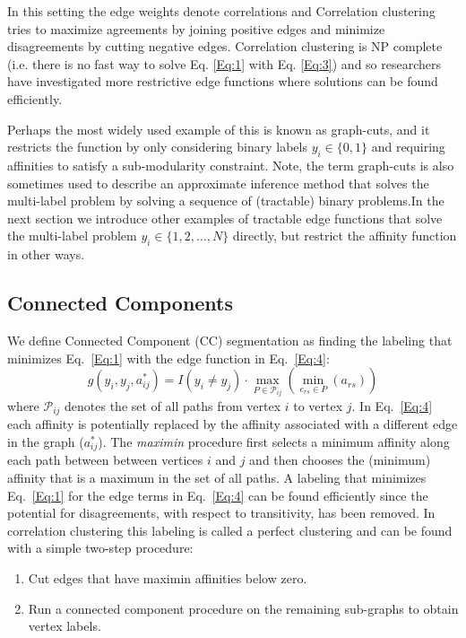 \documentclass[letterpaper,twocolumn,fleqn]{article}
\begin{document}
In this setting  the edge weights denote correlations and Correlation clustering tries to maximize agreements by joining positive edges and minimize disagreements by cutting negative edges. Correlation clustering is NP complete (i.e. there is no fast way to solve Eq. \ref{Eq:1} with Eq. \ref{Eq:3}) and so researchers have investigated more restrictive edge functions where solutions can be found efficiently. 

Perhaps the most widely used example of this is known as graph-cuts, and it restricts the function by only considering binary labels $y_i \in \{0,1\}$ and requiring affinities to satisfy a sub-modularity constraint. Note, the term graph-cuts is also sometimes used to describe an approximate inference method that solves the multi-label problem by solving a sequence of (tractable) binary problems.In the next section we introduce other examples of tractable edge functions that solve the multi-label problem $y_i \in \{1,2,...,N\}$ directly, but restrict the affinity function in other ways. 

\subsection{Connected Components}
\label{subsec:cc}

We define Connected Component (CC) segmentation as finding the labeling that minimizes Eq.~\ref{Eq:1} with the edge function in Eq.~\ref{Eq:4}: 
\begin{equation}
    g(y_i, y_j, a_{ij}^*) = I(y_i \neq y_j)\cdot\max_{P\in\mathcal{P}_{ij}}\left( \min_{e_{rs} \in P} ( a_{rs} ) \right) 
    \label{Eq:4}
\end{equation}
where $\mathcal{P}_{ij}$ denotes the set of all paths from vertex $i$ to vertex $j$. In Eq.~\ref{Eq:4} each affinity is potentially replaced by the affinity associated with a different edge in the graph ($a_{ij}^*$). The \emph{maximin} procedure first selects a minimum affinity along each path between between vertices $i$ and $j$ and then chooses the (minimum) affinity that is a maximum in the set of all paths. A labeling that minimizes Eq.~\ref{Eq:1} for the edge terms in Eq.~\ref{Eq:4} can be found efficiently since the potential for disagreements, with respect to transitivity, has been removed. In correlation clustering  this labeling is called a perfect clustering and can be found with a simple two-step procedure:
\begin{enumerate}
\item Cut  edges that have maximin affinities below zero.
\item Run a connected component procedure on the remaining sub-graphs to obtain vertex labels.
\end{enumerate}
\end{document}
